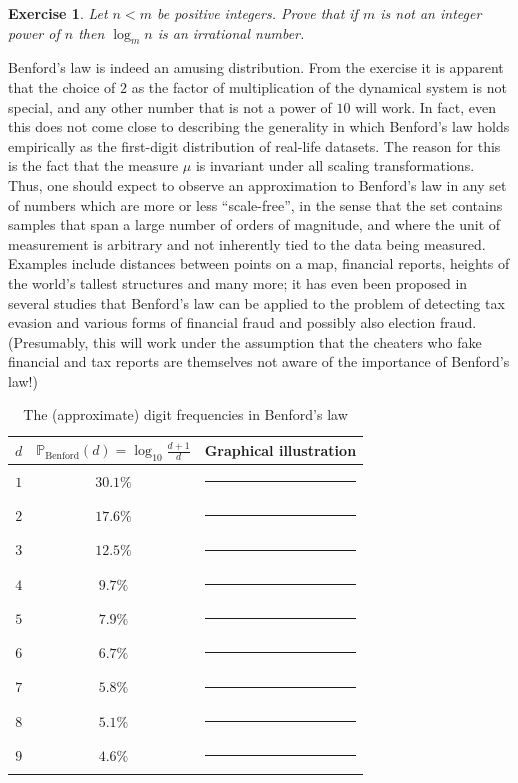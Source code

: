 \documentclass[12pt]{article}
\newtheorem{exercise}[thm]{Exercise}
\theoremstyle{example}
\begin{document}
\begin{enumerate}
\begin{exercise}
Let $n<m$ be positive integers. Prove that if $m$ is not an integer power of $n$ then $\log_m n$ is an irrational number.
\end{exercise}

Benford's law is indeed an amusing distribution. From the exercise it is apparent that the choice of $2$ as the factor of multiplication of the dynamical system is not special, and any other number that is not a power of $10$ will work. In fact, even this does not come close to describing the generality in which Benford's law holds empirically as the first-digit distribution of real-life datasets. The reason for this is the fact that the measure $\mu$ is invariant under all scaling transformations. Thus, one should expect to observe an approximation to Benford's law in any set of numbers which are more or less ``scale-free'', in the sense that the set contains samples that span a large number of orders of magnitude, and where the unit of measurement is arbitrary and not inherently tied to the data being measured. Examples include distances between points on a map, financial reports, heights of the world's tallest structures and many more; it has even been proposed in several studies that Benford's law can be applied to the problem of detecting tax evasion and various forms of financial fraud and possibly also election fraud. (Presumably, this will work under the assumption that the cheaters who fake financial and tax reports are themselves not aware of the importance of Benford's law!)

\begin{table}
\begin{center}
\begin{tabular}{c|c|l}
$d$ & $\mathbb{P}_\textrm{Benford}(d) = \log_{10}\frac{d+1}{d}$ & Graphical illustration
\\
\hline
$1$ & $30.1\%$ & \rule{30.1mm}{10.0pt}
\\
$2$ & $17.6\%$ & \rule{17.6mm}{10.0pt}
\\
$3$ & $12.5\%$ & \rule{12.5mm}{10.0pt}
\\
$4$ & $9.7\%$ & \rule{9.7mm}{10.0pt}
\\
$5$ & $7.9\%$ & \rule{7.9mm}{10.0pt}
\\
$6$ & $6.7\%$ & \rule{6.7mm}{10.0pt}
\\
$7$ & $5.8\%$ & \rule{5.8mm}{10.0pt}
\\
$8$ & $5.1\%$ & \rule{5.1mm}{10.0pt}
\\
$9$ & $4.6\%$ & \rule{4.6mm}{10.0pt}
\end{tabular}
\caption{The (approximate) digit frequencies in Benford's law}
\end{center}
\end{table}


\end{enumerate}
\end{document}
